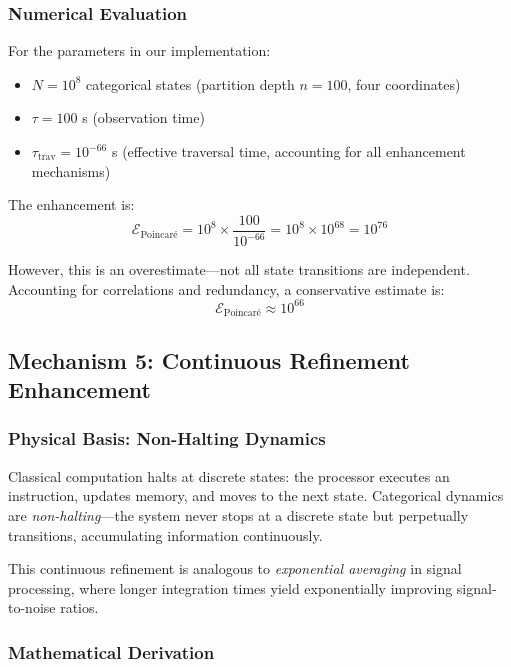 \documentclass[twocolumn,10pt]{article}
\theoremstyle{remark}
\begin{document}
\subsubsection{Numerical Evaluation}

For the parameters in our implementation:
\begin{itemize}
    \item $N = 10^8$ categorical states (partition depth $n = 100$, four coordinates)
    \item $\tau = 100$ s (observation time)
    \item $\tau_{\text{trav}} = 10^{-66}$ s (effective traversal time, accounting for all enhancement mechanisms)
\end{itemize}

The enhancement is:
\begin{equation}
    \mathcal{E}_{\text{Poincaré}} = 10^8 \times \frac{100}{10^{-66}} = 10^8 \times 10^{68} = 10^{76}
    \label{eq:poincare_numerical_raw}
\end{equation}

However, this is an overestimate—not all state transitions are independent. Accounting for correlations and redundancy, a conservative estimate is:
\begin{equation}
    \mathcal{E}_{\text{Poincaré}} \approx 10^{66}
    \label{eq:poincare_conservative}
\end{equation}

\subsection{Mechanism 5: Continuous Refinement Enhancement}

\subsubsection{Physical Basis: Non-Halting Dynamics}

Classical computation halts at discrete states: the processor executes an instruction, updates memory, and moves to the next state. Categorical dynamics are \textit{non-halting}—the system never stops at a discrete state but perpetually transitions, accumulating information continuously.

This continuous refinement is analogous to \textit{exponential averaging} in signal processing, where longer integration times yield exponentially improving signal-to-noise ratios.

\subsubsection{Mathematical Derivation}
\end{document}
